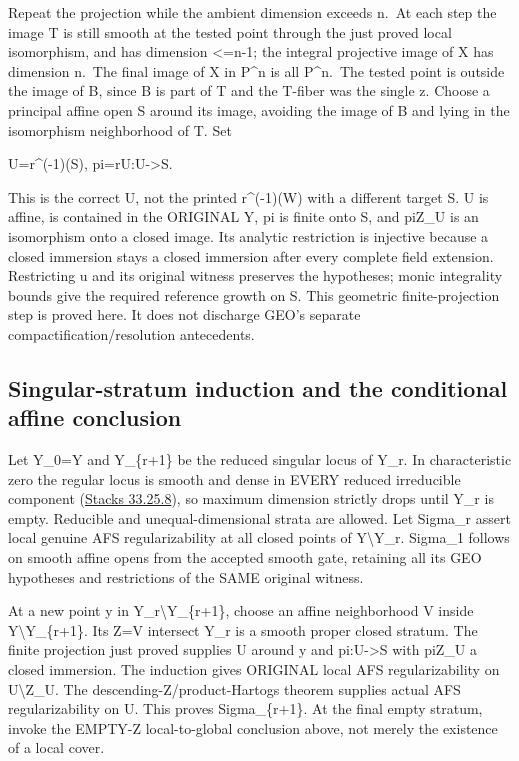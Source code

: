 \documentclass[
  10pt,
]{article}
\begin{document}
Repeat the projection while the ambient dimension exceeds n.~At each
step the image T is still smooth at the tested point through the just
proved local isomorphism, and has dimension \textless=n-1; the integral
projective image of X has dimension n.~The final image of X in P\^{}n is
all P\^{}n.~The tested point is outside the image of B, since B is part
of T and the T-fiber was the single z. Choose a principal affine open S
around its image, avoiding the image of B and lying in the isomorphism
neighborhood of T. Set

U=r\^{}(-1)(S), pi=r\textbar U:U-\textgreater S.

This is the correct U, not the printed r\^{}(-1)(W) with a different
target S. U is affine, is contained in the ORIGINAL Y, pi is finite onto
S, and pi\textbar Z\_U is an isomorphism onto a closed image. Its
analytic restriction is injective because a closed immersion stays a
closed immersion after every complete field extension. Restricting u and
its original witness preserves the hypotheses; monic integrality bounds
give the required reference growth on S. This geometric
finite-projection step is proved here. It does not discharge GEO's
separate compactification/resolution antecedents.

\subsection{Singular-stratum induction and the conditional affine
conclusion}\label{singular-stratum-induction-and-the-conditional-affine-conclusion}

Let Y\_0=Y and Y\_\{r+1\} be the reduced singular locus of Y\_r. In
characteristic zero the regular locus is smooth and dense in EVERY
reduced irreducible component
(\href{https://stacks.math.columbia.edu/tag/0B8X}{Stacks 33.25.8}), so
maximum dimension strictly drops until Y\_r is empty. Reducible and
unequal-dimensional strata are allowed. Let Sigma\_r assert local
genuine AFS regularizability at all closed points of
Y\textbackslash Y\_r. Sigma\_1 follows on smooth affine opens from the
accepted smooth gate, retaining all its GEO hypotheses and restrictions
of the SAME original witness.

At a new point y in Y\_r\textbackslash Y\_\{r+1\}, choose an affine
neighborhood V inside Y\textbackslash Y\_\{r+1\}. Its Z=V intersect Y\_r
is a smooth proper closed stratum. The finite projection just proved
supplies U around y and pi:U-\textgreater S with pi\textbar Z\_U a
closed immersion. The induction gives ORIGINAL local AFS
regularizability on U\textbackslash Z\_U. The
descending-Z/product-Hartogs theorem supplies actual AFS
regularizability on U. This proves Sigma\_\{r+1\}. At the final empty
stratum, invoke the EMPTY-Z local-to-global conclusion above, not merely
the existence of a local cover.
\end{document}
